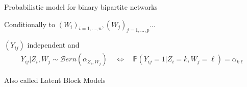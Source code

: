 \documentclass[compress,10pt]{beamer}
\begin{document}
\begin{frame}{Probabilistic model for binary  bipartite networks}

\begin{block}{Conditionally to $(W_i)_{i=1,\dots,n},(W_j)_{j=1,\dots,p}$... }

$(Y_{ij})$ independent and 
\begin{eqnarray*}
 Y_{ij}  | Z_i, W_j \sim  \mathcal{B}ern(\alpha_{Z_i,W_j}) \quad \Leftrightarrow \quad   \mathbb{P}(Y_{ij} = 1 | Z_i = k, W_j = \ell)  =  \alpha_{k\ell}
\end{eqnarray*}
\end{block}
 

 Also called Latent Block Models
\textcolor{mygreen}{\cite{Govaert2008}}

\end{frame}
\end{document}
